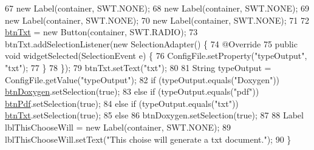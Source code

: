 \begin{DoxyCode}
67         \textcolor{keyword}{new} Label(container, SWT.NONE);
68         \textcolor{keyword}{new} Label(container, SWT.NONE);
69         \textcolor{keyword}{new} Label(container, SWT.NONE);
70         \textcolor{keyword}{new} Label(container, SWT.NONE);
71         
72         \hyperlink{classit_1_1isislab_1_1masonhelperdocumentation_1_1mason_1_1wizards_1_1_a1___choose_output_a4332e3cc38ddfd02242b707d92333cd3}{btnTxt} = \textcolor{keyword}{new} Button(container, SWT.RADIO);
73         btnTxt.addSelectionListener(\textcolor{keyword}{new} SelectionAdapter() \{
74             @Override
75             \textcolor{keyword}{public} \textcolor{keywordtype}{void} widgetSelected(SelectionEvent e) \{
76                 ConfigFile.setProperty(\textcolor{stringliteral}{"typeOutput"}, \textcolor{stringliteral}{"txt"});
77             \}
78         \});
79         btnTxt.setText(\textcolor{stringliteral}{"txt"});
80         
81         String typeOutput = ConfigFile.getValue(\textcolor{stringliteral}{"typeOutput"});
82         \textcolor{keywordflow}{if} (typeOutput.equals(\textcolor{stringliteral}{"Doxygen"}))   \hyperlink{classit_1_1isislab_1_1masonhelperdocumentation_1_1mason_1_1wizards_1_1_a1___choose_output_ac2ea8ed088a188d85870e9afb90b8f88}{btnDoxygen}.setSelection(\textcolor{keyword}{true});
83         \textcolor{keywordflow}{else} \textcolor{keywordflow}{if} (typeOutput.equals(\textcolor{stringliteral}{"pdf"}))  \hyperlink{classit_1_1isislab_1_1masonhelperdocumentation_1_1mason_1_1wizards_1_1_a1___choose_output_ae7d5e743ab4af65fec8563ca08ed561c}{btnPdf}.setSelection(\textcolor{keyword}{true});
84         \textcolor{keywordflow}{else} \textcolor{keywordflow}{if} (typeOutput.equals(\textcolor{stringliteral}{"txt"}))  \hyperlink{classit_1_1isislab_1_1masonhelperdocumentation_1_1mason_1_1wizards_1_1_a1___choose_output_a4332e3cc38ddfd02242b707d92333cd3}{btnTxt}.setSelection(\textcolor{keyword}{true});
85         \textcolor{keywordflow}{else}
86             btnDoxygen.setSelection(\textcolor{keyword}{true});
87         
88         Label lblThisChooseWill = \textcolor{keyword}{new} Label(container, SWT.NONE);
89         lblThisChooseWill.setText(\textcolor{stringliteral}{"This choise will generate a txt document."});
90     \}
\end{DoxyCode}
